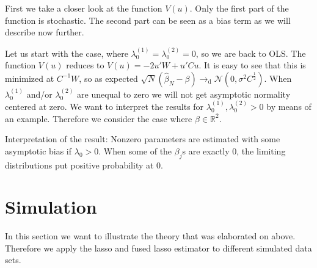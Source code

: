 \documentclass{article}
\theoremstyle{definition}
\DeclareMathOperator*{\argmin}{arg\,min}
\begin{document}
\noindent First we take a closer look at the function $V(u)$. Only the first part of the function is stochastic. The second part can be seen as a bias term as we will describe now further.
\smallskip

\noindent Let us start with the case, where $\lambda_0^{(1)}= \lambda_0^{(2)} = 0$, so we are back to OLS. The function $V(u)$ reduces to $V(u) = -2u'W + u'Cu$. It is easy to see that this is minimized at $C^{-1}W$, so as expected 		$\sqrt{N}(\hat{\beta}_N - \beta) \rightarrow_{\text{d}} \mathcal{N}(0,\sigma^2 C^{\frac{1}{2}})$.
When $\lambda_0^{(1)}$ and/or $\lambda_0^{(2)}$ are unequal to zero we will not get asymptotic normality centered at zero. \newline
We want to interpret the results for $\lambda_0^{(1)}, \lambda_0^{(2)} > 0$ by means of an example. Therefore we consider the case where $\beta \in \mathbb{R}^2$.
%


Interpretation of the result: Nonzero parameters are estimated with some asymptotic bias if $\lambda_0 > 0$. When some of the $\beta_j$s are exactly $0$, the limiting distributions put positive probability at $0$. 


\newpage
\section{Simulation}

In this section we want to illustrate the theory that was elaborated on above. Therefore we apply the lasso and fused lasso estimator to different simulated data sets.
\end{document}
